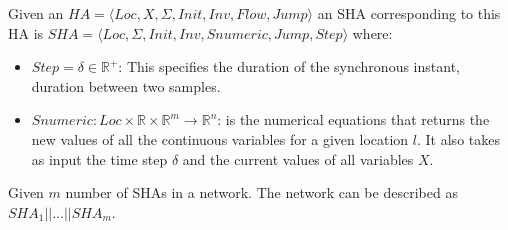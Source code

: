 \begin{definition}
	Given an
	$HA = \langle Loc, X, \Sigma, Init, Inv, Flow, Jump \rangle$ an \ac{SHA} corresponding to
	this \ac{HA} is \newline
	$SHA = \langle Loc,  \Sigma, Init, Inv, Snumeric, Jump, Step \rangle$ where:
	\begin{itemize}
		\item $Step = \delta \in \mathbb{R}^+$: This specifies the duration of the synchronous instant,  duration between 
		two samples.
		\item
		$Snumeric: Loc \times \mathbb{R} \times
		\mathbb{R}^m \rightarrow \mathbb{R}^n$:
		is the numerical equations that returns the new values of all the
		continuous variables for a given location $l$.
		It also takes as input the time step $\delta$ and the current values of all variables $X$.
	\end{itemize}
	\label{def:sha}
\end{definition}

Given  $m$   number of \acp{SHA} in a network.
The network can be described as $SHA_1 || \dots || SHA_m$.


